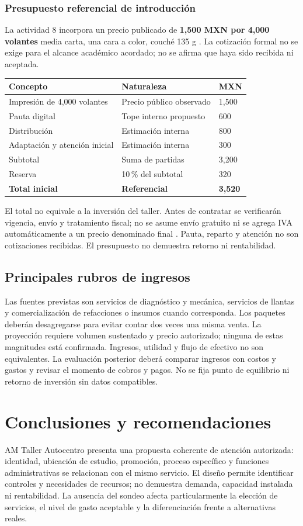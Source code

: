 {\subsubsection*{Presupuesto referencial de introducción}
La actividad 8 incorpora un precio publicado de \textbf{1,500 MXN por 4,000 volantes} media carta, una cara a color, couché 135 g \citep{volanteoMonterreyPromociones}. La cotización formal no se exige para el alcance académico acordado; no se afirma que haya sido recibida ni aceptada.
\begin{longtable}{p{.40\linewidth}p{.30\linewidth}p{.14\linewidth}}
\toprule
\textbf{Concepto} & \textbf{Naturaleza} & \textbf{MXN}\\
\midrule
Impresión de 4,000 volantes & Precio público observado & 1,500\\
Pauta digital & Tope interno propuesto & 600\\
Distribución & Estimación interna & 800\\
Adaptación y atención inicial & Estimación interna & 300\\
Subtotal & Suma de partidas & 3,200\\
Reserva & 10\,\% del subtotal & 320\\
\textbf{Total inicial} & \textbf{Referencial} & \textbf{3,520}\\
\bottomrule
\end{longtable}
El total no equivale a la inversión del taller. Antes de contratar se verificarán vigencia, envío y tratamiento fiscal; no se asume envío gratuito ni se agrega IVA automáticamente a un precio denominado final \citep{volanteoMonterreyEnvio}. Pauta, reparto y atención no son cotizaciones recibidas. El presupuesto no demuestra retorno ni rentabilidad.
\subsection{Principales rubros de ingresos}
Las fuentes previstas son servicios de diagnóstico y mecánica, servicios de llantas y comercialización de refacciones o insumos cuando corresponda. Los paquetes deberán desagregarse para evitar contar dos veces una misma venta. La proyección requiere volumen sustentado y precio autorizado; ninguna de estas magnitudes está confirmada.
Ingresos, utilidad y flujo de efectivo no son equivalentes. La evaluación posterior deberá comparar ingresos con costos y gastos y revisar el momento de cobros y pagos. No se fija punto de equilibrio ni retorno de inversión sin datos compatibles.
\section*{Conclusiones y recomendaciones}
AM Taller Autocentro presenta una propuesta coherente de atención autorizada: identidad, ubicación de estudio, promoción, proceso específico y funciones administrativas se relacionan con el mismo servicio. El diseño permite identificar controles y necesidades de recursos; no demuestra demanda, capacidad instalada ni rentabilidad. La ausencia del sondeo afecta particularmente la elección de servicios, el nivel de gasto aceptable y la diferenciación frente a alternativas reales.

}
